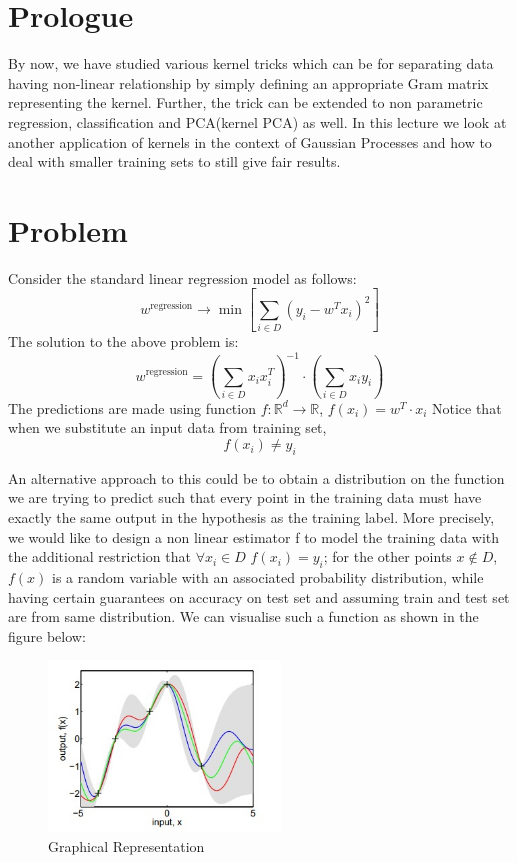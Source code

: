 \documentclass[12pt]{article}
\begin{document}
	\MakeScribeTop


\section{Prologue}
By now, we have studied various kernel tricks which can be for separating data having non-linear relationship by simply defining an appropriate Gram matrix representing the kernel. Further, the trick can be extended to non parametric regression\cite{reg}, classification and PCA(kernel PCA\cite{pca}) as well. In this lecture we look at another application of kernels in the context of Gaussian Processes and how to deal with smaller training sets to still give fair results. 

\section{Problem}
Consider the standard linear regression model as follows:
\[w^{\text{regression}}\rightarrow \min \left[\sum_{i\in D}(y_i -w^Tx_i)^2\right]\]
The solution to the above problem is:
\[w^{\text{regression}} = (\sum_{i \in D}x_ix_i^T)^{-1}\cdot(\sum_{i\in D}x_iy_i)\]
The predictions are made using function $f:\mathbb{R}^d\rightarrow \mathbb{R}$, $f(x_i) = w^T\cdot x_i$
Notice that when we substitute an input data from training set,
\[f(x_i) \neq y_i\]

An alternative approach to this could be to obtain a distribution on the function we are trying to predict such that every point in the training data must have exactly the same output in the hypothesis as the training label. More precisely,
we would like to design a non linear estimator f to model the training data with the additional restriction that $\forall x_i \in D$ $f(x_i) = y_i$; for the other points $x \notin D$, $f(x)$ is a random variable with an associated probability distribution, while having certain guarantees on accuracy on test set and assuming train and test set are from same distribution. We can visualise such a function as shown in the figure below: 


\begin{figure}[H]
    \centering
    \includegraphics[width = 0.55\textwidth]{graph.jpeg}
    \caption{Graphical Representation}
\end{figure}
\end{document}
